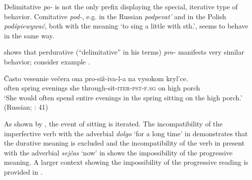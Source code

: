 \documentclass[output=paper,colorlinks,citecolor=brown]{langscibook}
\begin{document}
Delimitative \textit{po-} is not the only prefix displaying the special, iterative type of behavior. Comitative \textit{pod-}, e.g. in the Russian \textit{podpevat'} and in the Polish \textit{podśpiewywać}, both with the meaning ‘to sing a little with sth.’, seems to behave in the same way.

\citet[41]{Flier1985} shows that perdurative (``delimitative'' in his terms) \textit{pro-} manifests very similar behavior; consider example .

\ea\label{biskup:ex:pro}\ea\gll Často vesennie večera ona pro-siž-iva-l-a na vysokom kryl'ce.\\
often spring evenings she through-sit-\textsc{iter-pst-f.sg} on high porch\\
\glt ‘She would often spend entire evenings in the spring sitting on the high porch.’ \label{biskup:ex:pro.a}
 \hfill (Russian; \citealt{Flier1985}: 41)
\z\z

\noindent As shown by , the event of sitting is iterated. The incompatibility of the imperfective verb with the adverbial \textit{dolgo} ‘for a long time’ in  demonstrates that the durative meaning is excluded and the incompatibility of the verb in present with the adverbial \textit{sejčas} ‘now’ in  shows the impossibility of the progressive meaning. A larger context showing the impossibility of the progressive reading is provided in .

\z
\end{document}
